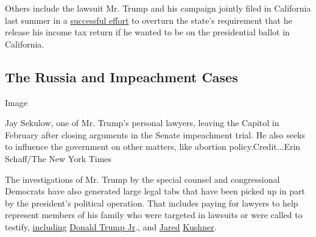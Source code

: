 Others include the lawsuit Mr. Trump and his campaign jointly filed in
California last summer in a
\href{https://int.graylady3jvrrxbe.onion/data/documenttools/tax-return-law-california-supreme-court/fad5a640e70d5bc1/full.pdf}{successful
effort} to overturn the state's requirement that he release his income
tax return if he wanted to be on the presidential ballot in California.

\hypertarget{the-russia-and-impeachment-cases}{%
\subsection{The Russia and Impeachment
Cases}\label{the-russia-and-impeachment-cases}}

Image

Jay Sekulow, one of Mr. Trump's personal lawyers, leaving the Capitol in
February after closing arguments in the Senate impeachment trial. He
also seeks to influence the government on other matters, like abortion
policy.Credit...Erin Schaff/The New York Times

The investigations of Mr. Trump by the special counsel and congressional
Democrats have also generated large legal tabs that have been picked up
in part by the president's political operation. That includes paying for
lawyers to help represent members of his family who were targeted in
lawsuits or were called to testify,
\href{https://www.fec.gov/data/disbursements/?data_type=processed\&recipient_name=alan+futerfas\&two_year_transaction_period=2020\&two_year_transaction_period=2018\&two_year_transaction_period=2016}{including}
\href{https://www.judiciary.senate.gov/imo/media/doc/Trump\%20Jr\%20Transcript_redacted.pdf}{Donald
Trump Jr}., and
\href{https://cases.justia.com/federal/district-courts/new-york/nysdce/1:2018cv03501/492363/221/0.pdf}{Jared}
\href{https://www.fec.gov/data/disbursements/?data_type=processed\&committee_id=C00580100\&recipient_name=Winston+\%26+Strawn\&two_year_transaction_period=2020\&two_year_transaction_period=2018\&two_year_transaction_period=2016}{Kushner}.

